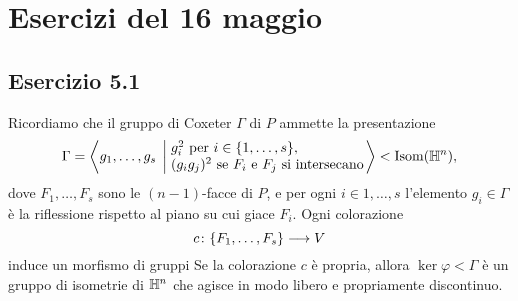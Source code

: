 \section*{Esercizi del 16 maggio}
\subsection*{Esercizio 5.1}
Ricordiamo che il gruppo di Coxeter $\Gamma$ di $P$ ammette la presentazione
\[
\Gamma=\left\langle g_1,\ldots,g_s\;\left\lvert\;\begin{matrix*}[l] g_i^2\text{ per $i\in\{1,\ldots,s\}$},\\(g_ig_j)^2\text{ se $F_i$ e $F_j$ si intersecano}\end{matrix*}\right.\right\rangle<\Isom(\HH^n),
\]
dove $F_1,\ldots,F_s$ sono le $(n-1)$-facce di $P$, e per ogni $i\in{1,\ldots,s}$ l'elemento $g_i\in\Gamma$ è la riflessione rispetto al piano su cui giace $F_i$. Ogni colorazione
\[
\map{c}{\{F_1,\ldots,F_s\}}{V}
\]
induce un morfismo di gruppi
Se la colorazione $c$ è propria, allora $\ker\varphi<\Gamma$ è un gruppo di isometrie di $\mathbb{H}^n$ che agisce in modo libero e propriamente discontinuo.

